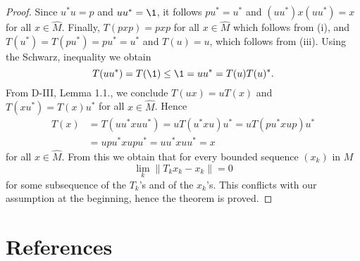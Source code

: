 \begin{proof}
Since $u^{*}u = p$ and $uu^{*} = \1$, it follows $pu^{*} = u^{*}$ and $(uu^{*})x(uu^{*}) = x$ for all $x \in \widehat{M}$.
Finally, $T(pxp) = pxp$ for all $x \in \widehat{M}$ which follows from (i), and $T(u^{*}) = T(pu^{*}) = pu^{*} = u^{*}$ and $T(u) = u$, which follows from (iii).
Using the Schwarz, inequality we obtain
\[
	T(uu^{*}) = T(\1) \leq \1 = uu^{*} = T(u)T(u)^{*}.
\]
From D-III, Lemma 1.1., we conclude $T(ux) = uT(x)$ and $T(xu^{*}) = T(x)u^{*}$ for all $x \in \widehat{M}$.
Hence
\begin{align*}
T(x) &= T(uu^{*}xuu^{*}) = uT(u^{*}xu)u^{*} = uT(pu^{*}xup)u^{*} \\
&= upu^{*}xupu^{*} = uu^{*}xuu^{*} = x
\end{align*}
for all $x \in \widehat{M}$.
From this we obtain that for every bounded sequence $(x_{k})$ in $M$
\[
	\lim_k \|T_k x_{k} - x_{k}\| = 0
\]
for some subsequence of the $T_{k}$'s and of the $x_{k}$'s.
This conflicts with our assumption at the beginning, hence the theorem is proved.
\end{proof}

%

\section*{References}
{\RaggedRight
\renewcommand{\bibsection}{}

}
